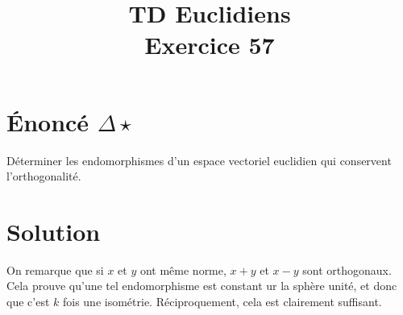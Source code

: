 \documentclass[french]{article}
\title{TD Euclidiens\\ Exercice 57}
\date{}
\begin{document}
\maketitle

\section{Énoncé $\Delta\star$}
Déterminer les endomorphismes d'un espace vectoriel euclidien qui conservent l'orthogonalité.
\section{Solution}
On remarque que si $x$ et $y$ ont même norme, $x+y$ et $x-y$ sont orthogonaux. Cela prouve qu'une tel endomorphisme est constant ur la sphère unité, et donc que c'est $k$ fois une isométrie. Réciproquement, cela est clairement suffisant.
\end{document}
